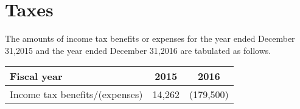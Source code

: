 

\chapter{Taxes}

The amounts of income tax benefits or expenses for the year ended December 31,2015 and the year ended December 31,2016 are tabulated as follows.

\begin{center}
\begin{tabular}{lcc}
	\toprule
	Fiscal year&2015&2016\\
	\midrule
	Income tax benefits/(expenses)&14,262&(179,500)\\
	\bottomrule
\end{tabular}
\end{center}


